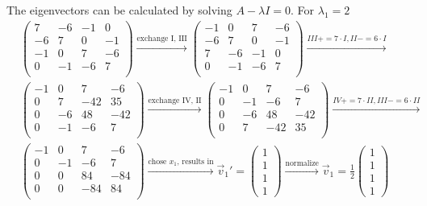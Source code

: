 \documentclass[a4paper,german,12pt,smallheadings]{scrartcl}
\begin{document}
\begin{enumerate}[a)]
    The eigenvectors can be calculated by solving $A - \lambda I = 0$. For $\lambda_1 = 2$
    \begin{align*}
      &\begin{pmatrix}
        7 & -6 & -1 & 0 \\
        -6 & 7 & 0 & -1 \\
        -1 & 0 & 7 & -6 \\
        0 & -1 & -6 & 7 \\
      \end{pmatrix}
      \xrightarrow{\text{exchange I, III}}
      \begin{pmatrix}
        -1 & 0 & 7 & -6 \\
        -6 & 7 & 0 & -1 \\
        7 & -6 & -1 & 0 \\
        0 & -1 & -6 & 7 \\
      \end{pmatrix}
      \xrightarrow{III += 7 \cdot I, II -= 6 \cdot I} \\
      &
      \begin{pmatrix}
        -1 & 0 & 7 & -6 \\
        0  & 7 & -42 & 35 \\
        0 & -6 & 48 & -42 \\
        0 & -1 & -6 & 7 \\
      \end{pmatrix}
      \xrightarrow{\text{exchange IV, II}}
      \begin{pmatrix}
        -1 & 0 & 7 & -6 \\
        0 & -1 & -6 & 7 \\
        0 & -6 & 48 & -42 \\
        0  & 7 & -42 & 35 \\
      \end{pmatrix}
      \xrightarrow{IV+=7\cdot II, III-=6 \cdot II} \\
      &
      \begin{pmatrix}
        -1 & 0 & 7 & -6 \\
        0 & -1 & -6 & 7 \\
        0 & 0 & 84 & -84 \\
        0  & 0 & -84 & 84 \\
      \end{pmatrix}
      \xrightarrow{\text{chose $x_1$, results in}}
      \vec{v}_1' = \begin{pmatrix} 1 \\ 1 \\ 1 \\ 1 \end{pmatrix}
      \xrightarrow{\text{normalize}}
      \vec{v}_1 = \frac{1}{2} \begin{pmatrix} 1 \\ 1 \\ 1 \\ 1 \end{pmatrix}
    \end{align*}
\end{enumerate}
\end{document}
